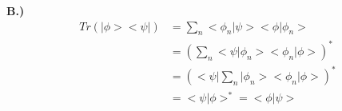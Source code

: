 \documentclass[10pt]{article} %
\newcommand{\bra}[1]{\big<#1\big|}
\newcommand{\ket}[1]{\big|#1\big>}
\newcommand{\braket}[2]{\big<#1\big|#2\big>}
\begin{document}
\textbf{B.)}
\begin{align*}
  Tr(\ket{\phi}\bra{\psi}) &= \sum_n \braket{\phi_n}{\psi}\braket{\phi}{\phi_n}\\
  &= \left(\sum_n \braket{\psi}{\phi_n}\braket{\phi_n}{\phi}\right)^*\\
  &= \left(\bra{\psi}\sum_n\ket{\phi_n}\braket{\phi_n}{\phi}\right)^*\\
  &= \braket{\psi}{\phi}^* = \braket{\phi}{\psi}
\end{align*}
\end{document}
